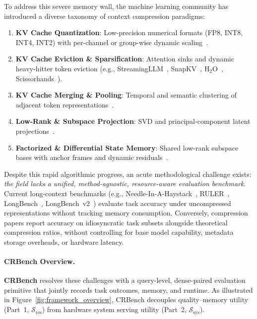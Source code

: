 \documentclass[10pt]{article}
\theoremstyle{definition}
\begin{document}
To address this severe memory wall, the machine learning community has introduced a diverse taxonomy of context compression paradigms:
\begin{enumerate}[leftmargin=*,itemsep=1.5pt]
    \item \textbf{KV Cache Quantization}: Low-precision numerical formats (FP8, INT8, INT4, INT2) with per-channel or group-wise dynamic scaling~\citep{dettmers2022llmint8,hooper2024kvquant,liu2024kivi}.
    \item \textbf{KV Cache Eviction \& Sparsification}: Attention sinks and dynamic heavy-hitter token eviction (e.g., StreamingLLM~\citep{xiao2023streamingllm}, SnapKV~\citep{li2024snapkv}, $\text{H}_2\text{O}$~\citep{zhang2023h2o}, Scissorhands~\citep{liu2023scissorhands}).
    \item \textbf{KV Cache Merging \& Pooling}: Temporal and semantic clustering of adjacent token representations~\citep{ge2023model,zhang2024pyramidkv}.
    \item \textbf{Low-Rank \& Subspace Projection}: SVD and principal-component latent projections~\citep{sharma2023truth}.
    \item \textbf{Factorized \& Differential State Memory}: Shared low-rank subspace bases with anchor frames and dynamic residuals~\citep{chimurkar2026dkv}.
\end{enumerate}

Despite this rapid algorithmic progress, an acute methodological challenge exists: \emph{the field lacks a unified, method-agnostic, resource-aware evaluation benchmark}. Current long-context benchmarks (e.g., Needle-In-A-Haystack~\citep{kamradt2023needle}, RULER~\citep{hsieh2024ruler}, LongBench~\citep{bai2023longbench}, LongBench~v2~\citep{bai2024longbenchv2}) evaluate task accuracy under uncompressed representations without tracking memory consumption. Conversely, compression papers report accuracy on idiosyncratic task subsets alongside theoretical compression ratios, without controlling for base model capability, metadata storage overheads, or hardware latency.

\paragraph{CRBench Overview.} \textbf{CRBench} resolves these challenges with a query-level, dense-paired evaluation primitive that jointly records task outcomes, memory, and runtime. As illustrated in Figure~\ref{fig:framework_overview}, CRBench decouples quality--memory utility (Part~1, $\mathcal{S}_{\text{res}}$) from hardware system serving utility (Part~2, $\mathcal{S}_{\text{sys}}$).
\end{document}
